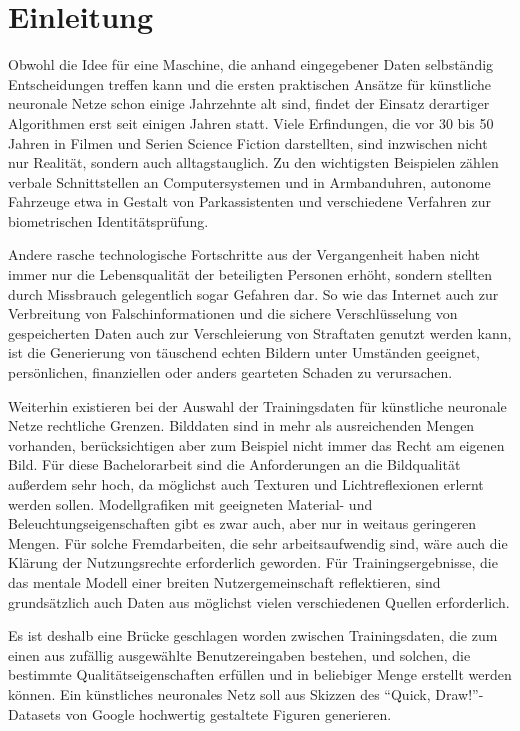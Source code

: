 \chapter{Einleitung}
\label{ch:einleitung}
Obwohl die Idee für eine Maschine, die anhand eingegebener Daten selbständig Entscheidungen treffen kann und die ersten praktischen Ansätze für künstliche neuronale Netze schon einige Jahrzehnte alt sind, findet der Einsatz derartiger Algorithmen erst seit einigen Jahren statt. Viele Erfindungen, die vor 30 bis 50 Jahren in Filmen und Serien Science Fiction darstellten, sind inzwischen nicht nur Realität, sondern auch alltagstauglich. Zu den wichtigsten Beispielen zählen verbale Schnittstellen an Computersystemen und in Armbanduhren, autonome Fahrzeuge etwa in Gestalt von Parkassistenten und verschiedene Verfahren zur biometrischen Identitätsprüfung.

Andere rasche technologische Fortschritte aus der Vergangenheit haben nicht immer nur die Lebensqualität der beteiligten Personen erhöht, sondern stellten durch Missbrauch gelegentlich sogar Gefahren dar. So wie das Internet auch zur Verbreitung von Falschinformationen und die sichere Verschlüsselung von gespeicherten Daten auch zur Verschleierung von Straftaten genutzt werden kann, ist die Generierung von täuschend echten Bildern unter Umständen geeignet, persönlichen, finanziellen oder anders gearteten Schaden zu verursachen.

Weiterhin existieren bei der Auswahl der Trainingsdaten für künstliche neuronale Netze rechtliche Grenzen. Bilddaten sind in mehr als ausreichenden Mengen vorhanden, berücksichtigen aber zum Beispiel nicht immer das Recht am eigenen Bild. Für diese Bachelorarbeit sind die Anforderungen an die Bildqualität außerdem sehr hoch, da möglichst auch Texturen und Lichtreflexionen erlernt werden sollen. Modellgrafiken mit geeigneten Material- und Beleuchtungseigenschaften gibt es zwar auch, aber nur in weitaus geringeren Mengen. Für solche Fremdarbeiten, die sehr arbeitsaufwendig sind, wäre auch die Klärung der Nutzungsrechte erforderlich geworden. Für Trainingsergebnisse, die das mentale Modell einer breiten Nutzergemeinschaft reflektieren, sind grundsätzlich auch Daten aus möglichst vielen verschiedenen Quellen erforderlich.

Es ist deshalb eine Brücke geschlagen worden zwischen Trainingsdaten, die zum einen aus zufällig ausgewählte Benutzereingaben bestehen, und solchen, die bestimmte Qualitätseigenschaften erfüllen und in beliebiger Menge erstellt werden können. Ein künstliches neuronales Netz soll aus Skizzen des ``Quick, Draw!''-Datasets von Google hochwertig gestaltete Figuren generieren.

